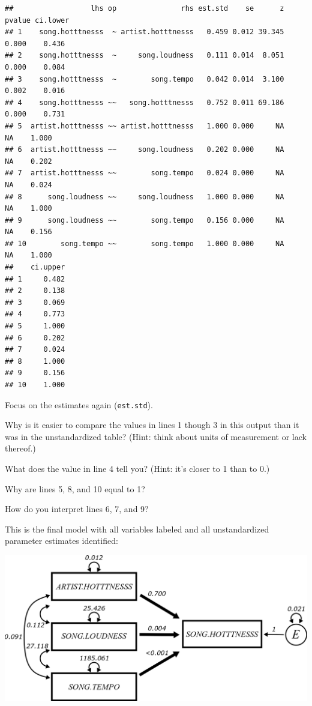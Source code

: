 \documentclass[
]{book}
\begin{document}
\begin{verbatim}
##                  lhs op               rhs est.std    se      z pvalue ci.lower
## 1    song.hotttnesss  ~ artist.hotttnesss   0.459 0.012 39.345  0.000    0.436
## 2    song.hotttnesss  ~     song.loudness   0.111 0.014  8.051  0.000    0.084
## 3    song.hotttnesss  ~        song.tempo   0.042 0.014  3.100  0.002    0.016
## 4    song.hotttnesss ~~   song.hotttnesss   0.752 0.011 69.186  0.000    0.731
## 5  artist.hotttnesss ~~ artist.hotttnesss   1.000 0.000     NA     NA    1.000
## 6  artist.hotttnesss ~~     song.loudness   0.202 0.000     NA     NA    0.202
## 7  artist.hotttnesss ~~        song.tempo   0.024 0.000     NA     NA    0.024
## 8      song.loudness ~~     song.loudness   1.000 0.000     NA     NA    1.000
## 9      song.loudness ~~        song.tempo   0.156 0.000     NA     NA    0.156
## 10        song.tempo ~~        song.tempo   1.000 0.000     NA     NA    1.000
##    ci.upper
## 1     0.482
## 2     0.138
## 3     0.069
## 4     0.773
## 5     1.000
## 6     0.202
## 7     0.024
## 8     1.000
## 9     0.156
## 10    1.000
\end{verbatim}

Focus on the estimates again (\texttt{est.std}).

Why is it easier to compare the values in lines 1 though 3 in this output than it was in the unstandardized table? (Hint: think about units of measurement or lack thereof.)

What does the value in line 4 tell you? (Hint: it's closer to 1 than to 0.)

Why are lines 5, 8, and 10 equal to 1?

How do you interpret lines 6, 7, and 9?

This is the final model with all variables labeled and all unstandardized parameter estimates identified:

\begin{center}\includegraphics{graphics/multiple_regression_music} \end{center}
\end{document}
